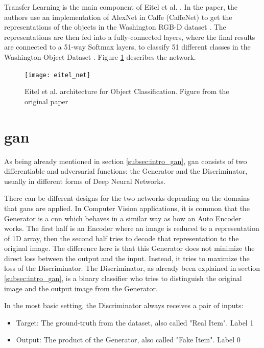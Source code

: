 Transfer Learning is the main component of Eitel et al. \cite{eitel}. In the paper, the
authors use an implementation of AlexNet in Caffe (CaffeNet) to get the representations of
the objects in the Washington RGB-D dataset \cite{washington_rgbd}. The representations
are then fed into a fully-connected layers, where the final results are connected to a
51-way Softmax layers, to classify 51 different classes in the Washington Object Dataset
\cite{washington_rgbd}.  Figure \ref{fig:eitel_net} describes the network.

\begin{figure}[h]
  \centering
  \texttt{[image: eitel\_net]}
  \caption{Eitel et al. architecture for Object Classification. Figure from the original
	  paper \cite{eitel}}\label{fig:eitel_net}
\end{figure}

\section{\acrfull{gan}}

As being already mentioned in section \ref{subsec:intro_gan}, \acrshort{gan} consists of
two differentiable and adversarial functions: the Generator and the Discriminator, usually
in different forms of Deep Neural Networks.  

There can be different designs for the two networks depending on the domains that
\acrshort{gan}s are applied. In Computer Vision applications, it is common that the
Generator is a \acrfull{cnn} which behaves in a similar way as how an Auto Encoder
\cite{auto_encoder} works. The first half is an Encoder where an image is reduced to a
representation of 1D array, then the second half tries to decode that representation to
the original image. The difference here is that this Generator does not minimize the
direct loss between the output and the input. Instead, it tries to maximize the loss of
the Discriminator. The Discriminator, as already been explained in section
\ref{subsec:intro_gan}, is a binary classifier who tries to distinguish the original image
and the output image from the Generator. 

In the most basic setting, the Discriminator always receives a pair of inputs:

\begin{itemize}
	\item Target: The ground-truth from the dataset, also called "Real Item". Label 1
	\item Output: The product of the Generator, also called "Fake Item". Label 0
\end{itemize}

